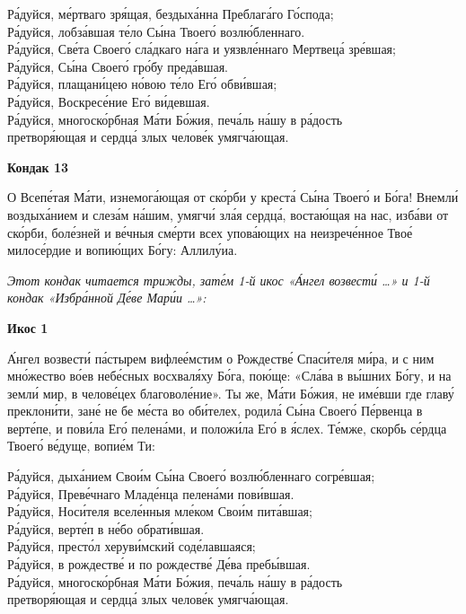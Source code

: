 \documentclass[14pt,article,oneside]{memoir}
\begin{document}
\noindent Ра́дуйся, ме́ртваго зря́щая, бездыха́нна Преблага́го Го́спода;\\ Ра́дуйся, лобза́вшая те́ло Сы́на Твоего́ возлю́бленнаго.\\
Ра́дуйся, Све́та Своего́ сла́дкаго на́га и уязвле́ннаго Мертвеца́ зре́вшая;\\ Ра́дуйся, Сы́на Своего́ гро́бу преда́вшая.\\
Ра́дуйся, плащани́цею но́вою те́ло Его́ обви́вшая;\\ Ра́дуйся, Воскресе́ние Его́ ви́девшая.\\
Ра́дуйся, многоско́рбная Ма́ти Бо́жия, печа́ль на́шу в ра́дость\\ \vin претворя́ющая и сердца́ злых челове́к умягча́ющая.

\begin{center}
  \textbf{Кондак 13}
\end{center}

О Всепе́тая Ма́ти, изнемога́ющая от ско́рби у креста́ Сы́на Твоего́ и Бо́га! Внемли́ воздыха́нием и слеза́м на́шим, умягчи́ зла́я сердца́, востаю́щая на нас, изба́ви от ско́рби, боле́зней и ве́чныя сме́рти всех упова́ющих на неизрече́нное Твое́ милосе́рдие и вопию́щих Бо́гу: Аллилу́иа.

\emph{Этот кондак читается трижды, зате́м 1-й икос «А́нгел возвести́ …» и 1-й кондак «Избра́нной Де́ве Мари́и …»:}

\begin{center}
  \textbf{Икос 1}
\end{center}

А́нгел возвести́ па́стырем вифлее́мстим о Рождестве́ Спаси́теля ми́ра, и с ним мно́жество во́ев небе́сных восхваля́ху Бо́га, пою́ще: «Сла́ва в вы́шних Бо́гу, и на земли́ мир, в челове́цех благоволе́ние». Ты же, Ма́ти Бо́жия, не име́вши где главу́ преклони́ти, зане́ не бе ме́ста во оби́телех, родила́ Сы́на Своего́ Пе́рвенца в верте́пе, и пови́ла Его́ пелена́ми, и положи́ла Его́ в я́слех. Те́мже, скорбь се́рдца Твоего́ ве́дуще, вопие́м Ти:

\noindent Ра́дуйся, дыха́нием Свои́м Сы́на Своего́ возлю́бленнаго согре́вшая;\\ Ра́дуйся, Преве́чнаго Младе́нца пелена́ми пови́вшая.\\
Ра́дуйся, Носи́теля вселе́нныя мле́ком Свои́м пита́вшая;\\ Ра́дуйся, верте́п в не́бо обрати́вшая.\\
Ра́дуйся, престо́л херуви́мский соде́лавшаяся;\\ Ра́дуйся, в рождестве́ и по рождестве́ Де́ва пребы́вшая.\\
Ра́дуйся, многоско́рбная Ма́ти Бо́жия, печа́ль на́шу в ра́дость\\ \vin претворя́ющая и сердца́ злых челове́к умягча́ющая.
\end{document}
